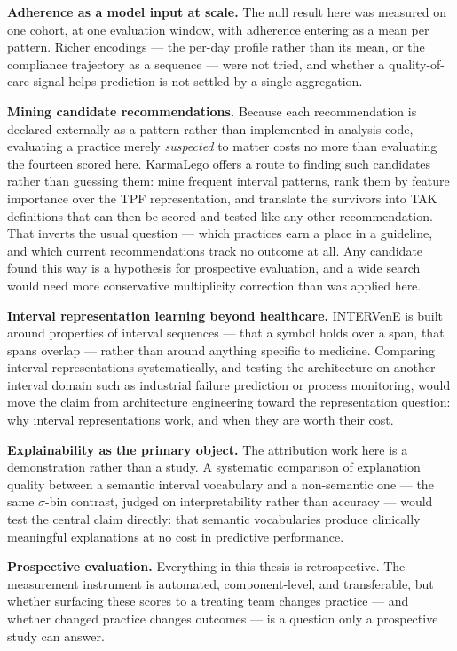 \textbf{Adherence as a model input at scale.} The null result here was
measured on one cohort, at one evaluation window, with adherence entering as
a mean per pattern. Richer encodings --- the per-day profile rather than its
mean, or the compliance trajectory as a sequence --- were not tried, and
whether a quality-of-care signal helps prediction is not settled by a single
aggregation.

\textbf{Mining candidate recommendations.} Because each recommendation is
declared externally as a pattern rather than implemented in analysis code,
evaluating a practice merely \emph{suspected} to matter costs no more than
evaluating the fourteen scored here. KarmaLego offers a route to finding
such candidates rather than guessing them: mine frequent interval patterns,
rank them by feature importance over the TPF representation, and translate
the survivors into TAK definitions that can then be scored and tested like
any other recommendation. That inverts the usual question --- which
practices earn a place in a guideline, and which current recommendations
track no outcome at all. Any candidate found this way is a hypothesis for
prospective evaluation, and a wide search would need more conservative
multiplicity correction than was applied here.

\textbf{Interval representation learning beyond healthcare.} INTERVenE is
built around properties of interval sequences --- that a symbol holds over
a span, that spans overlap --- rather than around anything specific to
medicine. Comparing interval representations systematically, and testing
the architecture on another interval domain such as industrial failure
prediction or process monitoring, would move the claim from architecture
engineering toward the representation question: why interval representations
work, and when they are worth their cost.

\textbf{Explainability as the primary object.} The attribution work here is
a demonstration rather than a study. A systematic comparison of explanation
quality between a semantic interval vocabulary and a non-semantic one --- the
same $\sigma$-bin contrast, judged on interpretability rather than accuracy
--- would test the central claim directly: that semantic vocabularies produce
clinically meaningful explanations at no cost in predictive performance.

\textbf{Prospective evaluation.} Everything in this thesis is retrospective.
The measurement instrument is automated, component-level, and transferable,
but whether surfacing these scores to a treating team changes practice ---
and whether changed practice changes outcomes --- is a question only a
prospective study can answer.

